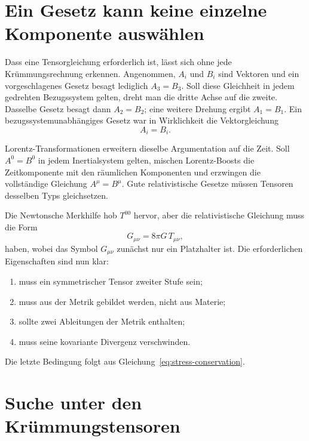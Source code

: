\section{Ein Gesetz kann keine einzelne Komponente auswählen}

Dass eine Tensorgleichung erforderlich ist, lässt sich ohne jede Krümmungsrechnung erkennen. Angenommen, \(A_i\) und \(B_i\) sind Vektoren und ein vorgeschlagenes Gesetz besagt lediglich \(A_3=B_3\). Soll diese Gleichheit in jedem gedrehten Bezugssystem gelten, dreht man die dritte Achse auf die zweite. Dasselbe Gesetz besagt dann \(A_2=B_2\); eine weitere Drehung ergibt \(A_1=B_1\). Ein bezugssystemunabhängiges Gesetz war in Wirklichkeit die Vektorgleichung
\begin{equation}
 A_i=B_i.
\end{equation}

Lorentz-Transformationen erweitern dieselbe Argumentation auf die Zeit. Soll \(A^0=B^0\) in jedem Inertialsystem gelten, mischen Lorentz-Boosts die Zeitkomponente mit den räumlichen Komponenten und erzwingen die vollständige Gleichung \(A^\mu=B^\mu\). Gute relativistische Gesetze müssen Tensoren desselben Typs gleichsetzen.

Die Newtonsche Merkhilfe hob \(T^{00}\) hervor, aber die relativistische Gleichung muss die Form
\begin{equation}
 G_{\mu\nu}=8\pi G\,T_{\mu\nu},
 \label{eq:field-schematic}
\end{equation}
haben, wobei das Symbol \(G_{\mu\nu}\) zunächst nur ein Platzhalter ist. Die erforderlichen Eigenschaften sind nun klar:
\begin{enumerate}
 \item muss ein symmetrischer Tensor zweiter Stufe sein;
 \item muss aus der Metrik gebildet werden, nicht aus Materie;
 \item sollte zwei Ableitungen der Metrik enthalten;
 \item muss seine kovariante Divergenz verschwinden.
\end{enumerate}
Die letzte Bedingung folgt aus Gleichung~\eqref{eq:stress-conservation}.

\section{Suche unter den Krümmungstensoren}

